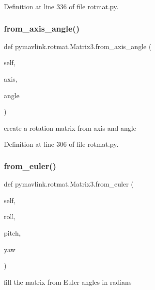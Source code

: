 Definition at line 336 of file rotmat.\+py.

\mbox{\label{classpymavlink_1_1rotmat_1_1Matrix3_a65a0956b9e01314396316e247ae56ed8}} 
\subsubsection{\texorpdfstring{from\_axis\_angle()}{from\_axis\_angle()}}
{\footnotesize\ttfamily def pymavlink.\+rotmat.\+Matrix3.\+from\+\_\+axis\+\_\+angle (\begin{DoxyParamCaption}\item[{}]{self,  }\item[{}]{axis,  }\item[{}]{angle }\end{DoxyParamCaption})}

\begin{DoxyVerb}create a rotation matrix from axis and angle\end{DoxyVerb}
 

Definition at line 306 of file rotmat.\+py.

\mbox{\label{classpymavlink_1_1rotmat_1_1Matrix3_ab56d7d62a2e980b5528cadd6af6f273d}} 
\subsubsection{\texorpdfstring{from\_euler()}{from\_euler()}}
{\footnotesize\ttfamily def pymavlink.\+rotmat.\+Matrix3.\+from\+\_\+euler (\begin{DoxyParamCaption}\item[{}]{self,  }\item[{}]{roll,  }\item[{}]{pitch,  }\item[{}]{yaw }\end{DoxyParamCaption})}

\begin{DoxyVerb}fill the matrix from Euler angles in radians\end{DoxyVerb}
 

